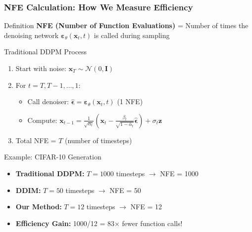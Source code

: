 \documentclass[aspectratio=169]{beamer}
\begin{document}
\begin{frame}
\frametitle{NFE Calculation: How We Measure Efficiency}
\begin{block}{Definition}
\textbf{NFE (Number of Function Evaluations)} = Number of times the denoising network $\boldsymbol{\varepsilon}_\theta(\mathbf{x}_t, t)$ is called during sampling
\end{block}

\begin{block}{Traditional DDPM Process}
\begin{enumerate}
\item Start with noise: $\mathbf{x}_T \sim \mathcal{N}(0, \mathbf{I})$
\item For $t = T, T-1, \ldots, 1$:
   \begin{itemize}
   \item Call denoiser: $\hat{\boldsymbol{\epsilon}} = \boldsymbol{\varepsilon}_\theta(\mathbf{x}_t, t)$ \textcolor{myred}{(1 NFE)}
   \item Compute: $\mathbf{x}_{t-1} = \frac{1}{\sqrt{\alpha_t}}\left(\mathbf{x}_t - \frac{\beta_t}{\sqrt{1-\bar{\alpha}_t}}\hat{\boldsymbol{\epsilon}}\right) + \sigma_t \mathbf{z}$
   \end{itemize}
\item Total NFE = $T$ (number of timesteps)
\end{enumerate}
\end{block}

\begin{exampleblock}{Example: CIFAR-10 Generation}
\begin{itemize}
\item \textbf{Traditional DDPM:} $T = 1000$ timesteps $\rightarrow$ NFE = 1000
\item \textbf{DDIM:} $T = 50$ timesteps $\rightarrow$ NFE = 50  
\item \textbf{Our Method:} $T = 12$ timesteps $\rightarrow$ NFE = 12
\item \textbf{Efficiency Gain:} 1000/12 = 83× fewer function calls!
\end{itemize}
\end{exampleblock}
\end{frame}
\end{document}
